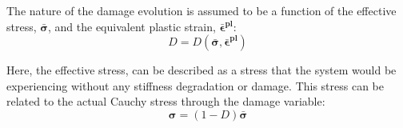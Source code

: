 The nature of the damage evolution is assumed to be a function of the effective stress, $\boldsymbol{\bar{\sigma}}$, and the equivalent plastic strain, $\boldsymbol{\bar{\epsilon}^{pl}}$:
\begin{equation}
D=D(\boldsymbol{\bar{\sigma}},\boldsymbol{\bar{\epsilon}^{pl}})\label{eqn:const8}
\end{equation}



Here, the effective stress,  can be described as a stress that the system would be experiencing without any stiffness degradation or damage. This stress can be related to the actual Cauchy stress through the damage variable: 
\begin{equation}
\boldsymbol{\sigma}=(1-D)\boldsymbol{\bar{\sigma}}\label{eqn:const7}
\end{equation}
